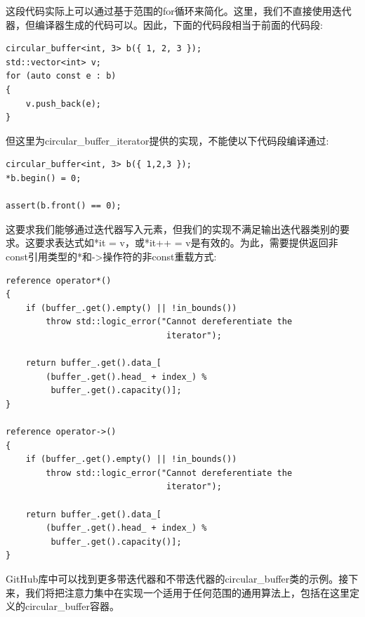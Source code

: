 这段代码实际上可以通过基于范围的for循环来简化。这里，我们不直接使用迭代器，但编译器生成的代码可以。因此，下面的代码段相当于前面的代码段:

\begin{lstlisting}[style=styleCXX]
circular_buffer<int, 3> b({ 1, 2, 3 });
std::vector<int> v;
for (auto const e : b)
{
	v.push_back(e);
}
\end{lstlisting}

但这里为circular\_buffer\_iterator提供的实现，不能使以下代码段编译通过:

\begin{lstlisting}[style=styleCXX]
circular_buffer<int, 3> b({ 1,2,3 });
*b.begin() = 0;

assert(b.front() == 0);
\end{lstlisting}

这要求我们能够通过迭代器写入元素，但我们的实现不满足输出迭代器类别的要求。这要求表达式如*it = v，或*it++ = v是有效的。为此，需要提供返回非const引用类型的*和->操作符的非const重载方式:

\begin{lstlisting}[style=styleCXX]
reference operator*()
{
	if (buffer_.get().empty() || !in_bounds())
		throw std::logic_error("Cannot dereferentiate the
								iterator");
	
	return buffer_.get().data_[
		(buffer_.get().head_ + index_) %
		 buffer_.get().capacity()];
}

reference operator->()
{
	if (buffer_.get().empty() || !in_bounds())
		throw std::logic_error("Cannot dereferentiate the
								iterator");
								
	return buffer_.get().data_[
		(buffer_.get().head_ + index_) %
		 buffer_.get().capacity()];
}
\end{lstlisting}

GitHub库中可以找到更多带迭代器和不带迭代器的circular\_buffer类的示例。接下来，我们将把注意力集中在实现一个适用于任何范围的通用算法上，包括在这里定义的circular\_buffer容器。






















